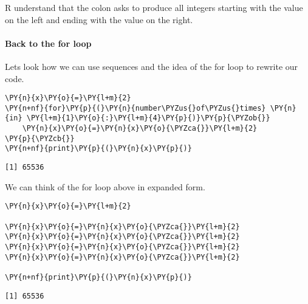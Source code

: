     
    R understand that the colon asks to produce all integers starting with
the value on the left and ending with the value on the right.

\hypertarget{back-to-the-for-loop}{%
\paragraph{Back to the for loop}\label{back-to-the-for-loop}}

Lets look how we can use sequences and the idea of the for loop to
rewrite our code.

    \begin{tcolorbox}[breakable, size=fbox, boxrule=1pt, pad at break*=1mm,colback=cellbackground, colframe=cellborder]
\begin{Verbatim}[commandchars=\\\{\}]
\PY{n}{x}\PY{o}{=}\PY{l+m}{2}
\PY{n+nf}{for}\PY{p}{(}\PY{n}{number\PYZus{}of\PYZus{}times} \PY{n}{in} \PY{l+m}{1}\PY{o}{:}\PY{l+m}{4}\PY{p}{)}\PY{p}{\PYZob{}}
    \PY{n}{x}\PY{o}{=}\PY{n}{x}\PY{o}{\PYZca{}}\PY{l+m}{2}
\PY{p}{\PYZcb{}}
\PY{n+nf}{print}\PY{p}{(}\PY{n}{x}\PY{p}{)}
\end{Verbatim}
\end{tcolorbox}

    \begin{Verbatim}[commandchars=\\\{\}]
[1] 65536
    \end{Verbatim}

    We can think of the for loop above in expanded form.

    \begin{tcolorbox}[breakable, size=fbox, boxrule=1pt, pad at break*=1mm,colback=cellbackground, colframe=cellborder]
\begin{Verbatim}[commandchars=\\\{\}]
\PY{n}{x}\PY{o}{=}\PY{l+m}{2}

\PY{n}{x}\PY{o}{=}\PY{n}{x}\PY{o}{\PYZca{}}\PY{l+m}{2}
\PY{n}{x}\PY{o}{=}\PY{n}{x}\PY{o}{\PYZca{}}\PY{l+m}{2}
\PY{n}{x}\PY{o}{=}\PY{n}{x}\PY{o}{\PYZca{}}\PY{l+m}{2}
\PY{n}{x}\PY{o}{=}\PY{n}{x}\PY{o}{\PYZca{}}\PY{l+m}{2}

\PY{n+nf}{print}\PY{p}{(}\PY{n}{x}\PY{p}{)}
\end{Verbatim}
\end{tcolorbox}

    \begin{Verbatim}[commandchars=\\\{\}]
[1] 65536
    \end{Verbatim}

